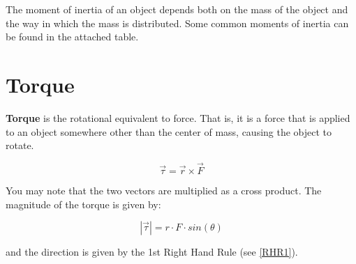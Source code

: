 	The moment of inertia of an object depends both on the mass of the object and the way in which the mass is distributed.  Some common moments of inertia can be found in the attached table.  
	
	\newpage 
	
	
	
	\section{Torque}
	\textbf{Torque} is the rotational equivalent to force.  That is, it is a force that is applied to an object somewhere other than the center of mass, causing the object to rotate.  
	
	
		\begin{mdframed}[backgroundcolor=orange!20!white]
		\begin{equation}
			\vec{\tau} = \vec{r} \times \vec{F}
			\label{equation:torque}
		\end{equation}
	\end{mdframed}
	
	
	You may note that the two vectors are multiplied as a cross product.  The magnitude of the torque is given by:
	
		\begin{mdframed}[backgroundcolor=orange!20!white]
		\begin{equation}
			|\vec{\tau}| = r \cdot F \cdot sin (\theta)
			\label{equation:torquemagnitude}
		\end{equation}
	\end{mdframed}
	
	and the direction is given by the 1st Right Hand Rule (see \cref{RHR1}).
	
